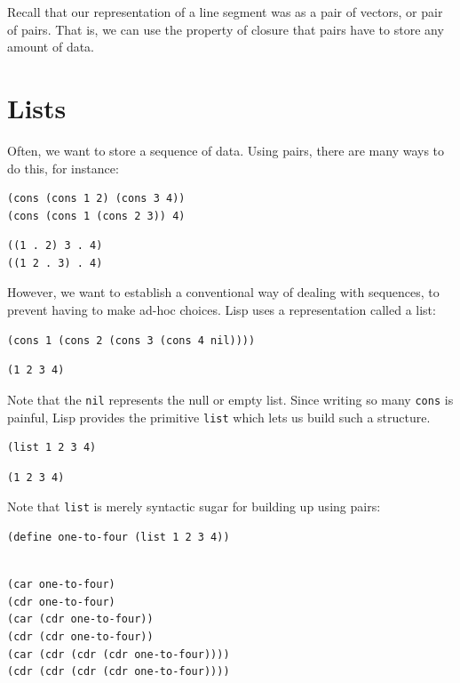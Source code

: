\documentclass[9pt]{report}
\begin{document}
Recall that our representation of a line segment was as a pair of
vectors, or pair of pairs. That is, we can use the property of
closure that pairs have to store any amount of data.

\section{Lists}
\label{sec:orgb5e3a55}
Often, we want to store a sequence of data. Using pairs, there are
many ways to do this, for instance:

\begin{verbatim}
(cons (cons 1 2) (cons 3 4))
(cons (cons 1 (cons 2 3)) 4)
\end{verbatim}

\begin{verbatim}
((1 . 2) 3 . 4)
((1 2 . 3) . 4)
\end{verbatim}


However, we want to establish a conventional way of dealing with
sequences, to prevent having to make ad-hoc choices. Lisp uses a
representation called a list:

\begin{verbatim}
(cons 1 (cons 2 (cons 3 (cons 4 nil))))
\end{verbatim}

\begin{verbatim}
(1 2 3 4)
\end{verbatim}


Note that the \texttt{nil} represents the null or empty list. Since
writing so many \texttt{cons} is painful, Lisp provides the primitive
\texttt{list} which lets us build such a structure.

\begin{verbatim}
(list 1 2 3 4)
\end{verbatim}

\begin{verbatim}
(1 2 3 4)
\end{verbatim}


Note that \texttt{list} is merely syntactic sugar for building up using
pairs:

\begin{verbatim}
(define one-to-four (list 1 2 3 4))
\end{verbatim}

\begin{verbatim}

(car one-to-four)
(cdr one-to-four)
(car (cdr one-to-four))
(cdr (cdr one-to-four))
(car (cdr (cdr (cdr one-to-four))))
(cdr (cdr (cdr (cdr one-to-four))))
\end{verbatim}
\end{document}
